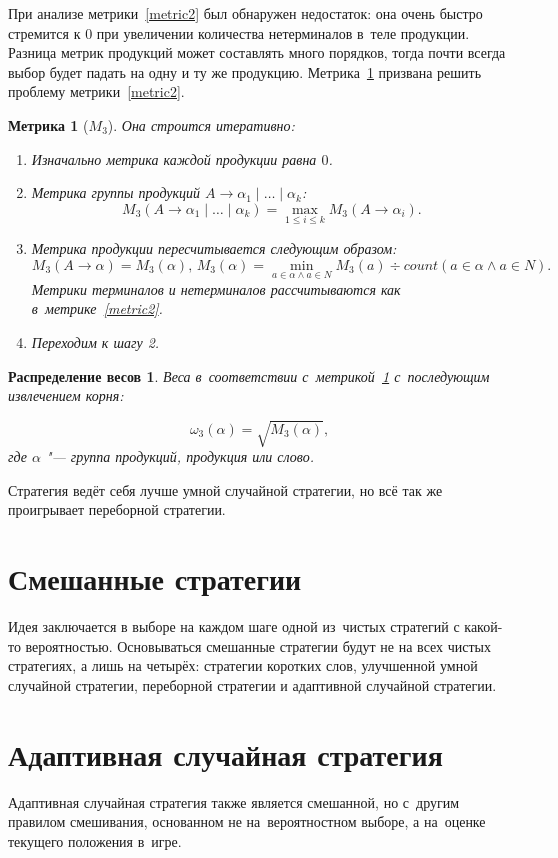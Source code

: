 \documentclass{csmathnotes}
\newtheorem{weight}{Распределение весов}
\newtheorem{metric}{Метрика}
\begin{document}
При анализе метрики~\ref{metric2} был обнаружен недостаток: она очень быстро стремится к 0 при увеличении количества нетерминалов в~теле продукции. Разница метрик продукций может составлять много порядков, тогда почти всегда выбор будет падать на одну и ту же продукцию. Метрика~\ref{metric3} призвана решить проблему метрики~\ref{metric2}.

\begin{metric}[$M_3$]
	\label{metric3}
	Она строится итеративно:
	\begin{enumerate}
		\item Изначально метрика каждой продукции равна $0$.
		\item Метрика группы продукций $A \rightarrow \alpha_1\mid \ldots \mid \alpha_k$: \[M_3(A \rightarrow \alpha_1\mid\ldots\mid\alpha_k)=\max_{1 \leqslant i \leqslant k}M_3(A\rightarrow\alpha_i).\]
		\item Метрика продукции пересчитывается следующим образом: \[M_3(A \rightarrow \alpha)=M_3(\alpha),\, M_3(\alpha)=\min_{a \in \alpha \wedge a \in N}M_3(a) \div count(a \in \alpha \wedge a \in N).\]
		Метрики терминалов и нетерминалов рассчитываются как в~метрике~\ref{metric2}.
		\item Переходим к шагу 2.
	\end{enumerate}
\end{metric}

\begin{weight}
	\label{weight3}
	Веса в~соответствии с~метрикой~\ref{metric3} с~последующим извлечением корня:
	
	\[\omega_3(\alpha) = \sqrt{M_3(\alpha)},\] где $\alpha$ "--- группа продукций, продукция или слово.
\end{weight}

Стратегия ведёт себя лучше умной случайной стратегии, но всё так же проигрывает переборной стратегии.

\section*{Смешанные стратегии}
Идея заключается в выборе на каждом шаге одной из~чистых стратегий с какой-то вероятностью. Основываться смешанные стратегии будут не на всех чистых стратегиях, а лишь на четырёх: стратегии коротких слов, улучшенной умной случайной стратегии, переборной стратегии и адаптивной случайной стратегии. 

\section*{Адаптивная случайная стратегия}
Адаптивная случайная стратегия также является смешанной, но с~другим правилом смешивания, основанном не на~вероятностном выборе, а на~оценке текущего положения в~игре.
\end{document}
